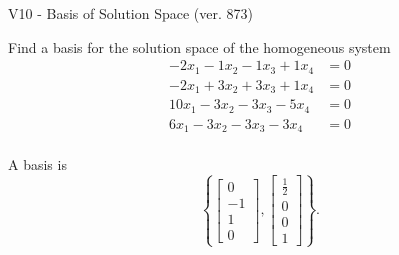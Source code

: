 \begin{exercise}
  \begin{exerciseTitle}V10 - Basis of Solution Space (ver. 873)\end{exerciseTitle}
  \begin{exerciseStatement}
    Find a basis for the solution space of the homogeneous system 
\begin{align*}
 -2 x_ 1 -1 x_ 2 -1 x_ 3 + 1 x_ 4 &= 0  \\ 
  -2 x_ 1 + 3 x_ 2 + 3 x_ 3 + 1 x_ 4 &= 0  \\ 
  10 x_ 1 -3 x_ 2 -3 x_ 3 -5 x_ 4 &= 0  \\ 
  6 x_ 1 -3 x_ 2 -3 x_ 3 -3 x_ 4 &= 0  \\ 
 \end{align*}


 
  \end{exerciseStatement}

  \begin{exerciseAnswer}
   A basis is   
\[\left\{\left[\begin{array}{c}
0 \\
-1 \\
1 \\
0
\end{array}\right] , \left[\begin{array}{c}
\frac{1}{2} \\
0 \\
0 \\
1
\end{array}\right]\right\}.\]

  


  \end{exerciseAnswer}
\end{exercise}